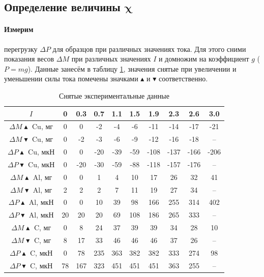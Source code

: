 \documentclass[a4paper,12pt]{article} %
\begin{document}
\subsection{Определение величины $\boldsymbol\chi$}

\paragraph{Измерим} перегрузку $\Delta P$ для образцов при различных значениях тока. Для 
этого сними показания весов $\Delta M$ при различных значениях $I$ и домножим на коэффициент $g$ ($P = mg$). Данные занесём в таблицу \ref{tab:measure}, значения снятые при увеличении и уменьшении силы тока помечены значками $\blacktriangle$ и $\blacktriangledown$ соответственно.

\begin{table}[h]
\begin{center}
\begin{tabular}{|c||c|c|c|c|c|c|c|c|c|}
\hline 
$I$ & 0 & 0.3 & 0.7 & 1.1 & 1.5 & 1.9 & 2.3 & 2.6 & 3.0 \\ 
\hline 
$\Delta M \blacktriangle$ Cu, мг & 0 & 0 & -2 & -4 & -6 & -11 & -14 & -17 & -21 \\ 
\hline 
$\Delta M \blacktriangledown$ Cu, мг & 0 & -2 & -3 & -6 & -9 & -12 & -16 & -18 & -- \\ 
\hline 
$\Delta P \blacktriangle$ Cu, мкН & 0 & 0 & -20 & -39 & -59 & -108 & -137 & -166 & -206 \\ 
\hline 
$\Delta P \blacktriangledown$ Cu, мкН & 0 & -20 & -30 & -59 & -88 & -118 & -157 & -176 & -- \\ 
\hline 
$\Delta M \blacktriangle$ Al, мг & 0 & 0 & 1 & 4 & 10 & 17 & 26 & 32 & 41 \\ 
\hline 
$\Delta M \blacktriangledown$ Al, мг & 2 & 2 & 2 & 7 & 11 & 19 & 27 & 34 & -- \\ 
\hline 
$\Delta P \blacktriangle$ Al, мкН & 0 & 0 & 10 & 39 & 98 & 166 & 255 & 314 & 402 \\ 
\hline 
$\Delta P \blacktriangledown$ Al, мкН & 20 & 20 & 20 & 69 & 108 & 186 & 265 & 333 & -- \\ 
\hline 
$\Delta M \blacktriangle$ C, мг & 0 & 8 & 24 & 37 & 39 & 39 & 34 & 28 & 10 \\ 
\hline 
$\Delta M \blacktriangledown$ C, мг & 8 & 17 & 33 & 46 & 46 & 46 & 37 & 26 & -- \\ 
\hline 
$\Delta P \blacktriangle$ C, мкН & 0 & 78 & 235 & 363 & 382 & 382 & 333 & 274 & 98 \\ 
\hline 
$\Delta P \blacktriangledown$ C, мкН & 78 & 167 & 323 & 451 & 451 & 451 & 363 & 255 & -- \\ 
\hline 
\end{tabular} 
\caption{Снятые экспериментальные данные}
\label{tab:measure}
\end{center}
\end{table}
\end{document}

